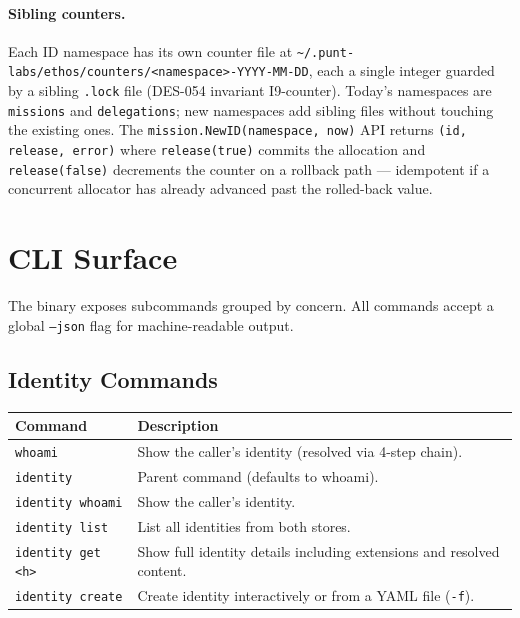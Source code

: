 \documentclass[a4paper,10pt]{article}
\newcommand{\cmd}[1]{\texttt{#1}}
\newcommand{\fpath}[1]{\texttt{#1}}
\begin{document}
\paragraph{Sibling counters.}  Each ID namespace has its own
counter file at
\fpath{\~{}/.punt-labs/ethos/counters/<namespace>-YYYY-MM-DD},
each a single integer guarded by a sibling \texttt{.lock} file
(DES-054 invariant I9-counter).  Today's namespaces are
\texttt{missions} and \texttt{delegations}; new namespaces add
sibling files without touching the existing ones.  The
\texttt{mission.NewID(namespace, now)} API returns
\texttt{(id, release, error)} where \texttt{release(true)}
commits the allocation and \texttt{release(false)} decrements
the counter on a rollback path --- idempotent if a concurrent
allocator has already advanced past the rolled-back value.

\section{CLI Surface}

The binary exposes subcommands grouped by concern.  All commands
accept a global \cmd{--json} flag for machine-readable output.

\subsection{Identity Commands}

\begin{center}
\begin{tabular}{@{}lp{6.5cm}@{}}
\toprule
\textbf{Command} & \textbf{Description} \\
\midrule
\cmd{whoami}              & Show the caller's identity (resolved
                            via 4-step chain). \\
\cmd{identity}            & Parent command (defaults to whoami). \\
\cmd{identity whoami}     & Show the caller's identity. \\
\cmd{identity list}       & List all identities from both stores. \\
\cmd{identity get <h>}    & Show full identity details including
                            extensions and resolved content. \\
\cmd{identity create}     & Create identity interactively or from
                            a YAML file (\cmd{-f}). \\
\bottomrule
\end{tabular}
\end{center}
\end{document}
